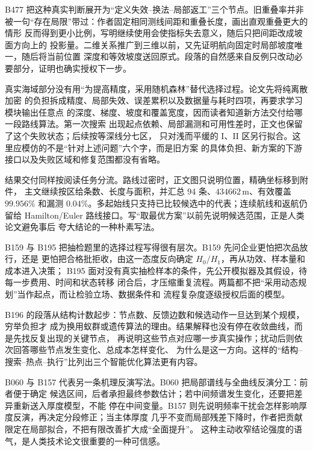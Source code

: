 B477 把这种真实判断展开为“定义失效--换法--局部返工”三个节点。旧重叠率并非
被一句“存在局限”带过：作者固定相同测线间距和重叠长度，画出直观重叠更大的情形
反而得到更小比例，写明继续使用会使指标失去意义，随后只把间距改成坡面方向上的
投影量。二维关系推广到三维以前，又先证明航向固定时局部坡度唯一，随后将当前位置
深度和等效坡度送回原式。段落的自然感来自反例只改动必要部分，证明也确实授权下一步。

真实海域部分没有用“为提高精度，采用随机森林”替代选择过程。论文先将纯离散加密
的负担拆成精度、局部失效、误差累积以及数据量与耗时四项，再要求学习模块输出任意点
的深度、梯度、坡度和覆盖宽度，因而读者知道新方法交付给哪一段路线算法。第一次搜索
出现起点依赖、局部漏测和可用性差时，正文也保留了这个失败状态；后续按等深线分七区，
只对浅而平缓的 I、II 区另行拟合。这里应模仿的不是“针对上述问题”六个字，而是旧方案
的具体负担、新方案的下游接口以及失败区域和修复范围都没有省略。

结果交付同样按阅读任务分流。路线过密时，正文图只说明位置，精确坐标移到附件，
主文继续按区给条数、长度与面积，并汇总 94 条、$434662\,\mathrm{m}$、有效覆盖
$99.956\%$ 和漏测 $0.04\%$。多起始线只支持已比较候选中的代表；连续航线和返航仍留给
Hamilton/Euler 路线接口。写“取最优方案”以前先说明候选范围，正是人类论文避免事后
夸大结论的一种朴素写法。

B159 与 B195 把抽检题里的选择过程写得很有层次。B159 先问企业更怕把次品放行，还是
更怕把合格批拒收，由这一态度反向确定 $H_0/H_1$，再从功效、样本量和成本进入决策；
B195 面对没有真实抽检样本的条件，先公开模拟器及其假设，待每一步费用、时间和状态转移
闭合后，才压缩重复流程。两篇都不把“采用动态规划”当作起点，而让检验立场、数据条件和
流程复杂度逐级授权后面的模型。

B196 的段落从结构计数起步：节点数、反馈边数和候选动作一旦达到某个规模，穷举负担才
成为换用蚁群或遗传算法的理由。结果解释也没有停在收敛曲线，而是先找反复出现的关键节点，
再说明这些节点对应哪一步真实操作；扰动后则依次回答哪些节点发生变化、总成本怎样变化、
为什么是这一方向。这样的“结构--搜索--热点--执行”比列出三个智能优化算法更有内容。

B060 与 B157 代表另一条机理反演写法。B060 把局部谱线与全曲线反演分工：前者便于确定
候选区间，后者承担最终参数估计；若中间频谱发生变化，还要把差异重新送入厚度模型，不能
停在中间变量。B157 则先说明频率干扰会怎样影响厚度反演，再决定分段修正；当主体厚度
几乎不变而局部残差下降时，作者把贡献限定在局部拟合，不把有限改善扩大成“全面提升”。
这种主动收窄结论强度的语气，是人类技术论文很重要的一种可信感。

